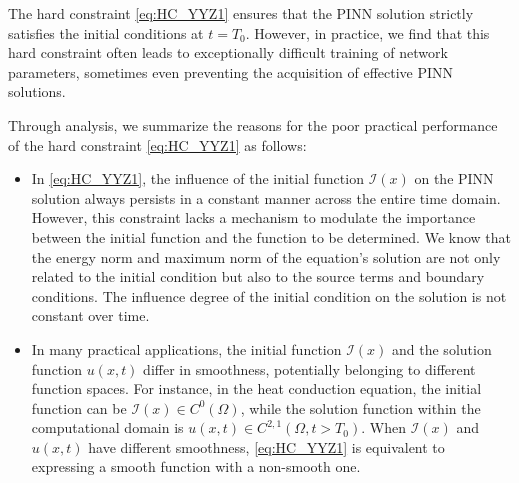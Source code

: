 \documentclass[preprint]{elsarticle}
\numberwithin{table}{section}
\numberwithin{equation}{section}
\numberwithin{figure}{section}
\begin{document}
\begin{CJK}{UTF8}{gbsn}
 



The hard constraint   \eqref{eq:HC_YYZ1}  ensures that the PINN solution strictly satisfies the initial conditions at $t=T_0$. However, in practice, we find that this hard constraint   often leads to exceptionally difficult training of network parameters, sometimes even preventing the acquisition of effective PINN solutions.


Through analysis, we summarize the reasons for the poor practical performance of the hard constraint \eqref{eq:HC_YYZ1} as follows:

\begin{itemize}
    \item  

    

In \eqref{eq:HC_YYZ1}, the influence of the initial   function $\mathcal{I}(x)$ on the PINN solution   always persists in a constant manner across the entire time domain. However, this constraint   lacks a mechanism to modulate the importance between the initial  function and the function to be determined. We know that the energy norm and maximum norm of the equation's solution are not only related to the initial condition but also to the source terms and boundary conditions. The  influence degree of the initial condition on the solution is not constant over time.



    
     \item 
     
     In many practical applications, the initial   function $\mathcal{I}(x)$ and the   solution function $u(x,t)$ differ in smoothness, potentially belonging to different function spaces. For instance, in the heat conduction equation, the initial function can be $\mathcal{I}(x)\in C^0(\Omega)$, while the   solution function  within the computational domain is $u(x,t)\in C^{2,1}(\Omega, t>T_0)$. When $\mathcal{I}(x)$ and $u(x,t)$ have different smoothness,  \eqref{eq:HC_YYZ1} is equivalent to expressing a smooth function with a non-smooth one.
     
      
\end{itemize}



\end{CJK}
\end{document}
